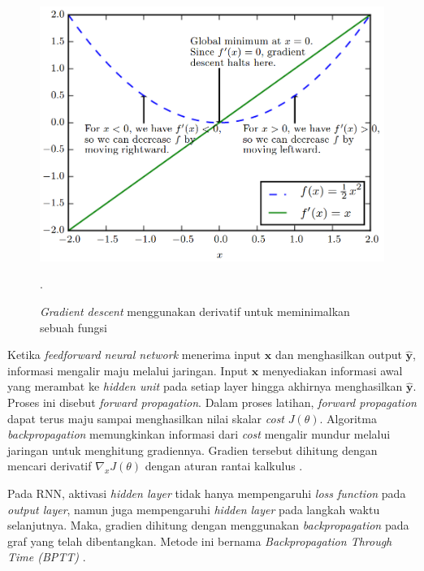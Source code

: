 \begin{figure}
    \centering
    \includegraphics[width=12cm]{gambar/landasan-teori/gradient-descent.png}
    \caption{\textit{Gradient descent} menggunakan derivatif untuk meminimalkan sebuah fungsi \Parencite{Goodfellow-2016}}.
    \label{gambar:gradient-descent}
\end{figure}

Ketika \textit{feedforward neural network} menerima input $\pmb{x}$ dan menghasilkan output $\pmb{\hat{y}}$, informasi mengalir maju melalui jaringan. Input $\pmb{x}$ menyediakan informasi awal yang merambat ke \textit{hidden unit} pada setiap layer hingga akhirnya menghasilkan $\pmb{\hat{y}}$. Proses ini disebut \textit{forward propagation}. Dalam proses latihan, \textit{forward propagation} dapat terus maju sampai menghasilkan nilai skalar \textit{cost} $J(\theta)$. Algoritma \textit{backpropagation} memungkinkan informasi dari \textit{cost} mengalir mundur melalui jaringan untuk menghitung gradiennya. Gradien tersebut dihitung dengan mencari derivatif $\nabla_x J(\theta)$ dengan aturan rantai kalkulus \Parencite{Goodfellow-2016}.

Pada RNN, aktivasi \textit{hidden layer} tidak hanya mempengaruhi \textit{loss function} pada \textit{output layer}, namun juga mempengaruhi \textit{hidden layer} pada langkah waktu selanjutnya. Maka, gradien dihitung dengan menggunakan \textit{backpropagation} pada graf yang telah dibentangkan. Metode ini bernama \textit{Backpropagation Through Time (BPTT)} \Parencite{graves-2012}.


